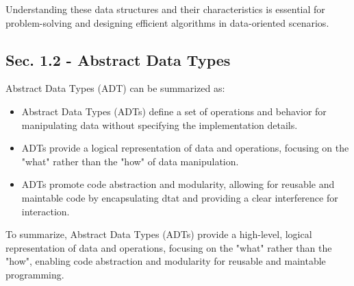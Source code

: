 Understanding these data structures and their characteristics is essential for problem-solving and designing efficient algorithms in data-oriented
scenarios.

\subsection*{Sec. 1.2 - Abstract Data Types}
Abstract Data Types (ADT) can be summarized as:
\begin{itemize}
    \item Abstract Data Types (ADTs) define a set of operations and behavior for manipulating data without specifying the implementation details.
    \item ADTs provide a logical representation of data and operations, focusing on the "what" rather than the "how" of data manipulation.
    \item ADTs promote code abstraction and modularity, allowing for reusable and maintable code by encapsulating dtat and providing a clear interference for interaction.
\end{itemize}
To summarize, Abstract Data Types (ADTs) provide a high-level, logical representation of data and operations, focusing on the "what" rather than the "how", enabling
code abstraction and modularity for reusable and maintable programming.

